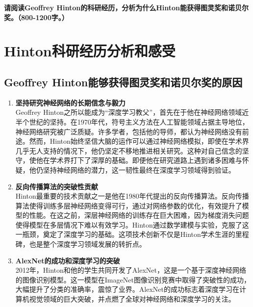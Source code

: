 \documentclass[UTF8]{homework}
\begin{document}
\maketitle
\if{}
    \pagebreak
\fi


%
%
\begin{homeworkProblem}
\textbf{请阅读Geoffrey Hinton的科研经历，分析为什么Hinton能获得图灵奖和诺贝尔奖。（800-1200字。）}
    
\solution

\section{Hinton科研经历分析和感受}

\subsection{Geoffrey Hinton能够获得图灵奖和诺贝尔奖的原因}

\begin{enumerate}
	\item \textbf{坚持研究神经网络的长期信念与毅力} \\
	Geoffrey Hinton之所以能成为“深度学习教父”，首先在于他在神经网络领域近半个世纪的坚持。在1970年代，符号主义方法在人工智能领域占据主导地位，神经网络研究被广泛质疑。许多学者，包括他的导师，都认为神经网络没有前途。然而，Hinton始终坚信大脑的运作可以通过神经网络模拟，即使在学术界几乎无人支持的情况下，他仍坚定不移地推进相关研究。这种对自己信念的坚守，使他在学术界打下了深厚的基础。即便他在研究道路上遇到诸多困难与怀疑，他仍坚持神经网络的潜力，这一韧性最终在深度学习领域得到验证。
	
	\item \textbf{反向传播算法的突破性贡献} \\
	Hinton最重要的技术贡献之一是他在1980年代提出的反向传播算法。反向传播算法使得训练多层神经网络变得可行，通过对网络参数的优化，有效提升了模型的性能。在这之前，深层神经网络的训练存在巨大困难，因为梯度消失问题使得模型在多层情况下难以有效学习。Hinton通过数学建模与实验，克服了这一瓶颈，奠定了深度学习的基础。这项技术创新不仅是Hinton学术生涯的里程碑，也是整个深度学习领域发展的转折点。
	
	\item \textbf{AlexNet的成功和深度学习的突破} \\
	2012年，Hinton和他的学生共同开发了AlexNet，这是一个基于深度神经网络的图像识别模型。这一模型在ImageNet图像识别竞赛中取得了突破性的成功，大幅提升了分类的准确率，震惊了业界。AlexNet的成功标志着深度学习在计算机视觉领域的巨大突破，并点燃了全球对神经网络和深度学习的关注。
	

\end{enumerate}
\end{homeworkProblem}
\end{document}
